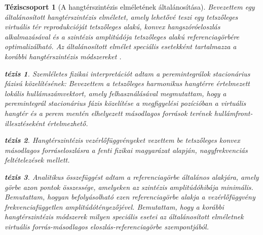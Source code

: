 \documentclass[10pt,twoside]{article}
\theoremstyle{thesisgroupstyle}
\newtheorem{thesisgroup}{Téziscsoport}
\theoremstyle{indented}
\newtheorem{thesis}{tézis}[thesisgroup]
\begin{document}
\begin{thesisgroup}[A hangtérszintézis elméletének általánosítása]
Bevezettem egy általánosított hangtérszintézis elméletet, amely lehetővé teszi egy tetszőleges virtuális tér reprodukcióját tetszőleges alakú, konvex hangszóróeloszlás alkalmazásával és a szintézis amplitúdója tetszőleges alakú referenciagörbére optimalizálható.
Az általánosított elmélet speciális esetekként tartalmazza  a korábbi hangtérszintézis módszereket \cite{Firtha2016_booklet}.
\begin{thesis}
Szemléletes fizikai interpretációt adtam a peremintegrálok stacionárius fázisú közelítésének:
Bevezettem a tetszőleges harmonikus hangtérre értelmezett lokális hullámszámvektort, amely felhasználásával megmutattam, hogy a peremintegrál stacionárius fázis közelítése a megfigyelési pozícióban a virtuális hangtér és a perem mentén elhelyezett másodlagos források terének hullámfront-illesztéseként értelmezhető.
\end{thesis}
\begin{thesis}
Hangtérszintézis vezérlőfüggvényeket vezettem be tetszőleges konvex másodlagos forráseloszlásra a fenti fizikai magyarázat alapján, nagyfrekvenciás feltételezések mellett.
\end{thesis}
\begin{thesis}
Analitikus összefüggést adtam a referenciagörbe általános alakjára, amely görbe azon pontok összessége, amelyeken az szintézis amplitúdóhibája minimális.
Bemutattam, hogyan befolyásolható ezen referenciagörbe alakja a vezérlőfüggvény frekvenciafüggetlen amplitúdótényezőjével.
Bemutattam, hogy a korábbi hangtérszintézis módszerek milyen speciális esetei az általánosított elméletnek virtuális forrás-másodlagos eloszlás-referenciagörbe szempontjából.
\end{thesis}
\end{thesisgroup}
\end{document}

